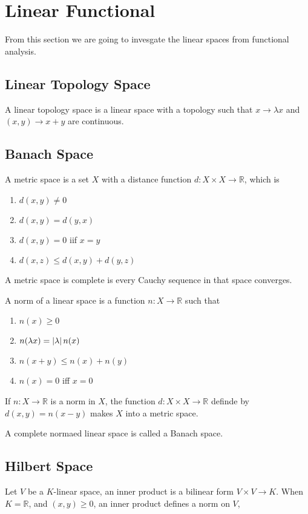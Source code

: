 

\section{Linear Functional}
From this section we are going to invesgate the linear spaces from functional analysis.

\subsection{Linear Topology Space}
A linear topology space is a linear space with a topology such that
$x \to \lambda x$ and $(x, y) \to x + y$ are continuous.

\subsection{Banach Space}
A metric space is a set $X$ with a distance function $d : X \times X \to \mathbb R$,
which is
\begin{enumerate}[1.]
\item $d(x, y) \neq 0$
\item $d(x, y) = d(y, x)$
\item $d(x, y) = 0$ iif $x = y$
\item $d(x, z) \leq d(x, y) + d(y, z)$
\end{enumerate}

A metric space is complete is every Cauchy sequence in that space converges.

A norm of a linear space is a function $n : X \to \mathbb R$ such that
\begin{enumerate}[1.]
\item $n(x) \geq 0$
\item $n(\lambda x) = \left| {\lambda} \right| n(x)$
\item $n(x + y) \leq n(x) + n(y)$
\item $n(x) = 0$ iff $x = 0$
\end{enumerate}

If $n : X \to \mathbb R$ is a norm in $X$, 
the function $d : X \times X \to \mathbb R$ definde by $d(x, y) = n(x - y)$ makes $X$ into a metric space.

A complete normaed linear space is called a Banach space. 

\subsection{Hilbert Space}
Let $V$ be a $K$-linear space, an inner product is a bilinear form $V \times V \to K$.
When $K = \mathbb R$, and $(x, y) \geq 0$, an inner product defines a norm on $V$,

